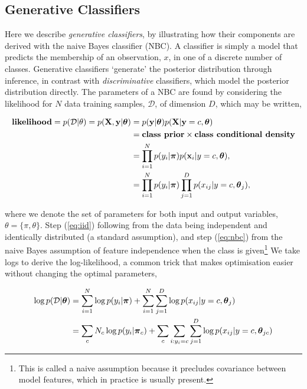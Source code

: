 \documentclass[11pt]{amsart}
\begin{document}
\subsection{Generative Classifiers}

Here we describe \emph{generative classifiers}, by illustrating how their components are derived with the naive Bayes classifier (NBC). A classifier is simply a model that predicts the membership of an observation, $x$, in one of a discrete number of classes. Generative classifiers `generate' the posterior distribution through inference, in contrast with \emph{discriminative} classifiers, which model the posterior distribution directly. The parameters of a NBC are found by considering the likelihood for $N$ data training samples, $\mathcal{D}$, of dimension $D$, which may be written,

\begin{align}
\textbf{likelihood} = p(\mathcal{D}|\theta) = p(\mathbf{X}, \mathbf{y}|\boldsymbol\theta) &= p(\mathbf{y}|\boldsymbol\theta)p(\mathbf{X}|\mathbf{y}=c,\boldsymbol\theta) \notag \\
&= \textbf{class prior} \times \textbf{class conditional density} \notag \\
&= \prod_{i=1}^N p(y_i|\boldsymbol\pi)p(\mathbf{x}_i|y=c,\boldsymbol\theta), \label{eq:iid} \\
&= \prod_{i=1}^N p(y_i|\boldsymbol\pi)\prod_{j = 1}^D p(x_{ij}|y=c,\boldsymbol\theta_j), \label{eq:nbc}
\end{align}

where we denote the set of parameters for both input and output variables, $\theta = \{\pi, \theta\}$. Step (\ref{eq:iid}) following from the data being independent and identically distributed (a standard assumption), and step (\ref{eq:nbc}) from the naive Bayes assumption of feature independence when the class is given\footnote{This is called a naive assumption because it precludes covariance between model features, which in practice is usually present.} We take logs to derive the log-likelihood, a common trick that makes optimisation easier without changing the optimal parameters,

\begin{align}
\log p(\mathcal{D}|\boldsymbol\theta) &= \sum_{i=1}^N \log p(y_i|\boldsymbol\pi) + \sum_{i=1}^N\sum_{j = 1}^D\log p(x_{ij}|y=c,\boldsymbol\theta_j) \notag \\
&= \sum_{c} N_c\log p(y_i|\boldsymbol\pi_c) + \sum_{c}\sum_{i:y_i=c}\sum_{j = 1}^D\log p(x_{ij}|y=c,\boldsymbol\theta_{jc}) \notag
\end{align}
\end{document}
